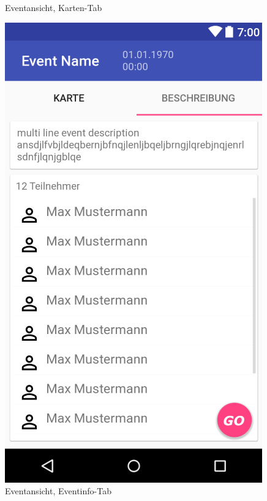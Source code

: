 \documentclass[parskip=full]{scrartcl}
\begin{document}
\begin{figure}[H]
\begin{minipage}[b]{0.4\textwidth}
	\caption{Eventansicht, Karten-Tab}\label{godetailansicht}
  \end{minipage}
  \hfill
  \begin{minipage}[b]{0.4\textwidth}
    \includegraphics[width=\textwidth]{GUI/AndroidStudio/event_info_teilnehmer.PNG}
	\caption{Eventansicht, Eventinfo-Tab}\label{goinfo}
  \end{minipage}
  \vspace{1cm}
\end{figure}
\end{document}
